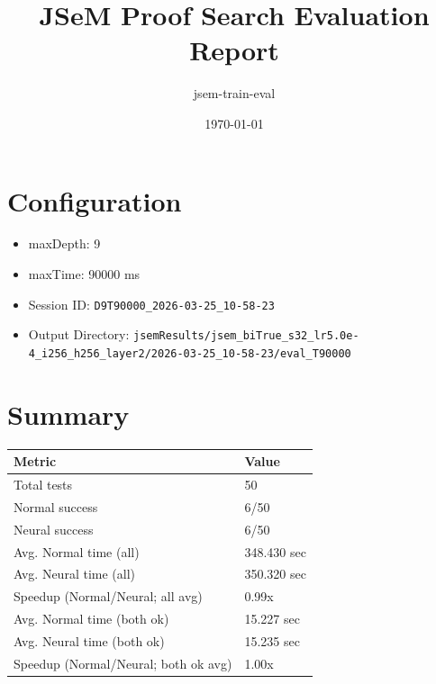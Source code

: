 \documentclass[a4paper,10pt]{article}
\title{JSeM Proof Search Evaluation Report}
\author{jsem-train-eval}
\date{\today}
\begin{document}
\maketitle

\section{Configuration}
\begin{itemize}
\item maxDepth: 9
\item maxTime: 90000 ms
\item Session ID: \texttt{D9T90000\_2026-03-25\_10-58-23}
\item Output Directory: \texttt{jsemResults/jsem\_biTrue\_s32\_lr5.0e-4\_i256\_h256\_layer2/2026-03-25\_10-58-23/eval\_T90000}
\end{itemize}

\section{Summary}
\begin{tabular}{ll}
\toprule
\textbf{Metric} & \textbf{Value} \\
\midrule
Total tests & 50 \\
Normal success & 6/50 \\
Neural success & 6/50 \\
\midrule
Avg. Normal time (all) & 348.430 sec \\
Avg. Neural time (all) & 350.320 sec \\
Speedup (Normal/Neural; all avg) & 0.99x \\
Avg. Normal time (both ok) & 15.227 sec \\
Avg. Neural time (both ok) & 15.235 sec \\
Speedup (Normal/Neural; both ok avg) & 1.00x \\
\bottomrule
\end{tabular}
\end{document}
